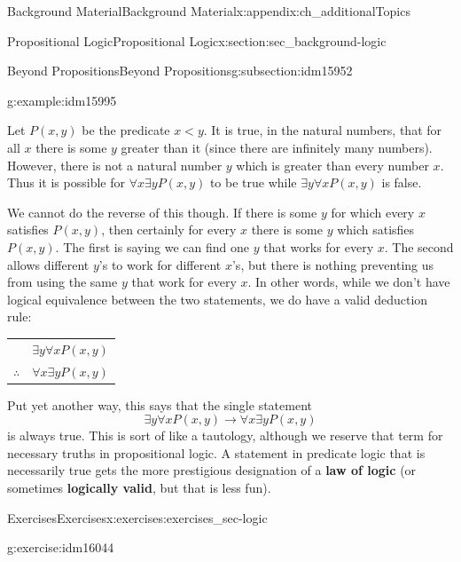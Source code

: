 \documentclass[oneside,10pt,]{book}
\newcommand{\terminology}[1]{\textbf{#1}}
\numberwithin{equation}{chapter}
\newcommand{\hrulethin}  {\noalign{\hrule height 0.04em}}
\def\imp{\rightarrow}
\newcommand{\lt}{<}
\begin{document}
\begin{appendixptx}{Background Material}{}{Background Material}{}{}{x:appendix:ch_additionalTopics}
\begin{sectionptx}{Propositional Logic}{}{Propositional Logic}{}{}{x:section:sec_background-logic}
\begin{subsectionptx}{Beyond Propositions}{}{Beyond Propositions}{}{}{g:subsection:idm15952}
\begin{example}{}{g:example:idm15995}
\par
Let \(P(x,y)\) be the predicate \(x \lt  y\). It is true, in the natural numbers, that for all \(x\) there is some \(y\) greater than it (since there are infinitely many numbers). However, there is not a natural number \(y\) which is greater than every number \(x\).  Thus it is possible for \(\forall x \exists y P(x,y)\) to be true while \(\exists y \forall x P(x,y)\) is false.%
\par
We cannot do the reverse of this though. If there is some \(y\) for which every \(x\) satisfies \(P(x,y)\), then certainly for every \(x\) there is some \(y\) which satisfies \(P(x,y)\). The first is saying we can find one \(y\) that works for every \(x\). The second allows different \(y\)'s to work for different \(x\)'s, but there is nothing preventing us from using the same \(y\) that work for every \(x\).  In other words, while we don't have logical equivalence between the two statements, we do have a valid deduction rule:%
\begin{sidebyside}{1}{0}{0}{0}%
\begin{sbspanel}{1}%
{\centering%
\begin{tabular}{cc}
&\(\exists y \forall x P(x,y)\)\tabularnewline\hrulethin
\(\therefore\)&\(\forall x \exists y P(x,y)\)
\end{tabular}
\par}
\end{sbspanel}%
\end{sidebyside}%
\par
Put yet another way, this says that the single statement%
\begin{equation*}
\exists y \forall x P(x,y) \imp \forall x \exists y P(x,y)
\end{equation*}
is always true.  This is sort of like a tautology, although we reserve that term for necessary truths in propositional logic.  A statement in predicate logic that is necessarily true gets the more prestigious designation of a \terminology{law of logic} (or sometimes \terminology{logically valid}, but that is less fun).%
\end{example}
\end{subsectionptx}
%
%
\typeout{************************************************}
\typeout{************************************************}
%
\begin{exercises-subsection}{Exercises}{}{Exercises}{}{}{x:exercises:exercises_sec-logic}
\begin{divisionexercise}{1}{}{}{g:exercise:idm16044}%

\end{divisionexercise}
\end{exercises-subsection}
\end{sectionptx}
\end{appendixptx}
\end{document}
